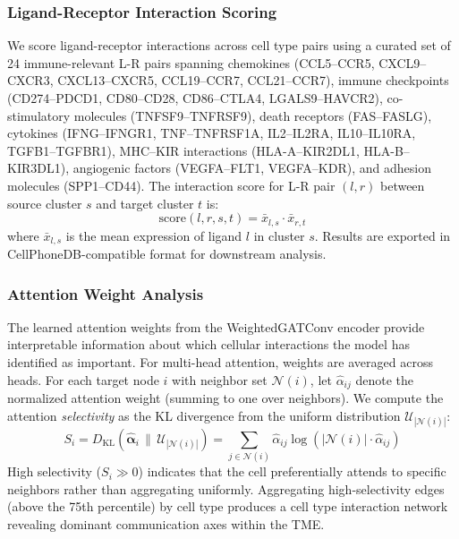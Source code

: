 \documentclass{article}
\begin{document}
\subsubsection{Ligand-Receptor Interaction Scoring}

We score ligand-receptor interactions across cell type pairs using a curated set of 24 immune-relevant L-R pairs spanning chemokines (CCL5--CCR5, CXCL9--CXCR3, CXCL13--CXCR5, CCL19--CCR7, CCL21--CCR7), immune checkpoints (CD274--PDCD1, CD80--CD28, CD86--CTLA4, LGALS9--HAVCR2), co-stimulatory molecules (TNFSF9--TNFRSF9), death receptors (FAS--FASLG), cytokines (IFNG--IFNGR1, TNF--TNFRSF1A, IL2--IL2RA, IL10--IL10RA, TGFB1--TGFBR1), MHC--KIR interactions (HLA-A--KIR2DL1, HLA-B--KIR3DL1), angiogenic factors (VEGFA--FLT1, VEGFA--KDR), and adhesion molecules (SPP1--CD44). The interaction score for L-R pair $(l, r)$ between source cluster $s$ and target cluster $t$ is:
\begin{equation}
\text{score}(l, r, s, t) = \bar{x}_{l,s} \cdot \bar{x}_{r,t}
\end{equation}
where $\bar{x}_{l,s}$ is the mean expression of ligand $l$ in cluster $s$. Results are exported in CellPhoneDB-compatible format for downstream analysis.

\subsubsection{Attention Weight Analysis}

The learned attention weights from the WeightedGATConv encoder provide interpretable information about which cellular interactions the model has identified as important. For multi-head attention, weights are averaged across heads. For each target node $i$ with neighbor set $\mathcal{N}(i)$, let $\hat{\alpha}_{ij}$ denote the normalized attention weight (summing to one over neighbors). We compute the attention \emph{selectivity} as the KL divergence from the uniform distribution $\mathcal{U}_{|\mathcal{N}(i)|}$:
\begin{equation}
S_i = D_{\text{KL}}\!\left(\hat{\boldsymbol{\alpha}}_i \,\|\, \mathcal{U}_{|\mathcal{N}(i)|}\right) = \sum_{j \in \mathcal{N}(i)} \hat{\alpha}_{ij} \log \left(|\mathcal{N}(i)| \cdot \hat{\alpha}_{ij}\right)
\end{equation}
High selectivity ($S_i \gg 0$) indicates that the cell preferentially attends to specific neighbors rather than aggregating uniformly. Aggregating high-selectivity edges (above the 75th percentile) by cell type produces a cell type interaction network revealing dominant communication axes within the TME.
\end{document}

